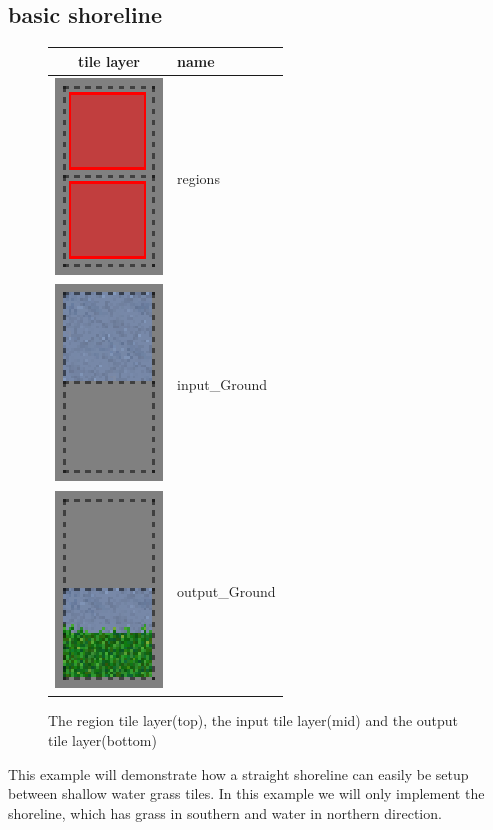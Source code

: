 \newpage
\subsection{basic shoreline} \label{basic_shoreline}
\begin{figure}
       \begin{tabular}{|c|l|}
       \hline
       tile layer & name \\
       \hline
       \hline
		\includegraphics[scale=1]{Example/TheManaWorld/shorelinestraight/regions.eps} & regions \\
		\hline
		\includegraphics[scale=1]{Example/TheManaWorld/shorelinestraight/input.eps} & input\_Ground\\
		\hline
		\includegraphics[scale=1]{Example/TheManaWorld/shorelinestraight/output.eps} & output\_Ground\\
		\hline
		\end{tabular}
  \caption{The region tile layer(top), the input tile layer(mid) and the output tile layer(bottom)}
  \label{shorelinestraight}
\end{figure}
This example will demonstrate how a straight shoreline can easily be setup 
between shallow water grass tiles. In this example we will only implement the
shoreline, which has grass in southern and water in northern direction.

